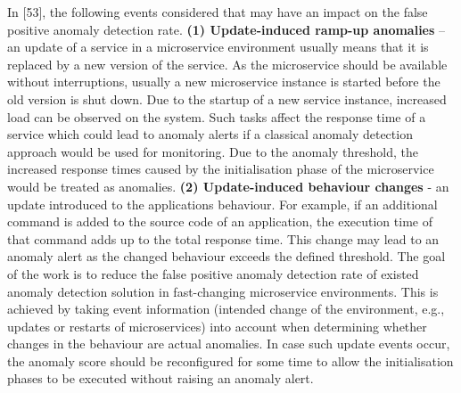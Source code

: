 \documentclass[]{usiinfprospectus}
\begin{document}
In [53], the following events considered that may have an impact on the false positive anomaly detection rate. \textbf{(1) Update-induced ramp-up anomalies } – an update of a service in a microservice environment usually means that it is replaced by a new version of the service. As the microservice should be available without interruptions, usually a new microservice instance is started before the old version is shut down. Due to the startup of a new service instance, increased load can be observed on the system. Such tasks affect the response time of a service which could lead to anomaly alerts if a classical anomaly detection approach would be used for monitoring. Due to the anomaly threshold, the increased response times caused by the initialisation phase of the microservice would be treated as anomalies. \textbf{ (2) Update-induced behaviour changes} - an update introduced to the applications behaviour. For example, if an additional command is added to the source code of an application, the execution time of that command adds up to the total response time. This change may lead to an anomaly alert as the changed behaviour exceeds the defined threshold. The goal of the work is to reduce the false positive anomaly detection rate of existed anomaly detection solution in fast-changing microservice environments. This is achieved by taking event information (intended change of the environment, e.g., updates or restarts of microservices) into account when determining whether changes in the behaviour are actual anomalies. In case such update events occur, the anomaly score should be reconfigured for some time to allow the initialisation phases to be executed without raising an anomaly alert.
%
%
%
\end{document}
